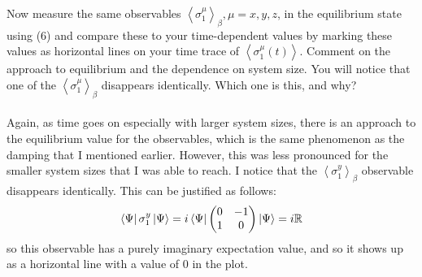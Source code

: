 \documentclass[12pt]{article}
\begin{document}
Now measure the same observables $\left\langle\sigma_{1}^{\mu}\right\rangle_{\beta}, \mu=x, y, z$, in the equilibrium state using (6) and compare these to your time-dependent values by marking these values as horizontal lines on your time trace of $\left\langle\sigma_{1}^{\mu}(t)\right\rangle$. Comment on the approach to equilibrium and the dependence on system size. You will notice that one of the $\left\langle\sigma_{1}^{\mu}\right\rangle_{\beta}$ disappears identically. Which one is this, and why?\\\\
Again, as time goes on especially with larger system sizes, there is an approach to the equilibrium value for the observables, which is the same phenomenon as the damping that I mentioned earlier. However, this was less pronounced for the smaller system sizes that I was able to reach. I notice that the $\left\langle\sigma_{1}^{y}\right\rangle_{\beta}$ observable disappears identically. This can be justified as follows:
\begin{equation}
\bra{\Psi } \sigma_{1}^{y} \ket{\Psi} = i \bra{\Psi } 
\begin{pmatrix}
0 & -1 \\
1 & 0
\end{pmatrix}
\ket{\Psi} = i \mathbb{R}
\end{equation}
so this observable has a purely imaginary expectation value, and so it shows up as a horizontal line with a value of 0 in the plot.
\end{document}
